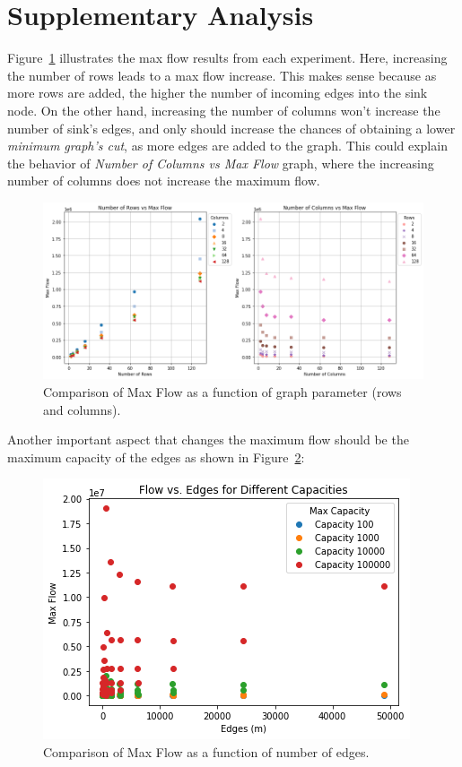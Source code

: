 \documentclass{article}
\begin{document}
\section{Supplementary Analysis}

Figure~\ref{fig:maxflow} illustrates the max flow results from each experiment. Here, increasing the number of rows leads to a max flow increase. This makes sense because as more rows are added, the higher the number of incoming edges into the sink node. On the other hand, increasing the number of columns won't increase the number of sink's edges, and only should increase the chances of obtaining a lower \emph{minimum graph's cut}, as more edges are added to the graph. This could explain the behavior of \emph{Number of Columns vs Max Flow} graph, where the increasing number of columns does not increase the maximum flow.
\begin{figure}[H]
\centering
\includegraphics[width=1.0\linewidth]{maxflow.png}
\caption{Comparison of Max Flow as a function of graph parameter (rows and columns).}
\label{fig:maxflow}
\end{figure}

Another important aspect that changes the maximum flow should be the maximum capacity of the edges as shown in Figure~\ref{fig:emaxflow}:

\begin{figure}[H]
\centering
\includegraphics[width=0.6\linewidth]{edges_maxflow.png}
\caption{Comparison of Max Flow as a function of number of edges.}
\label{fig:emaxflow}
\end{figure}
\end{document}
